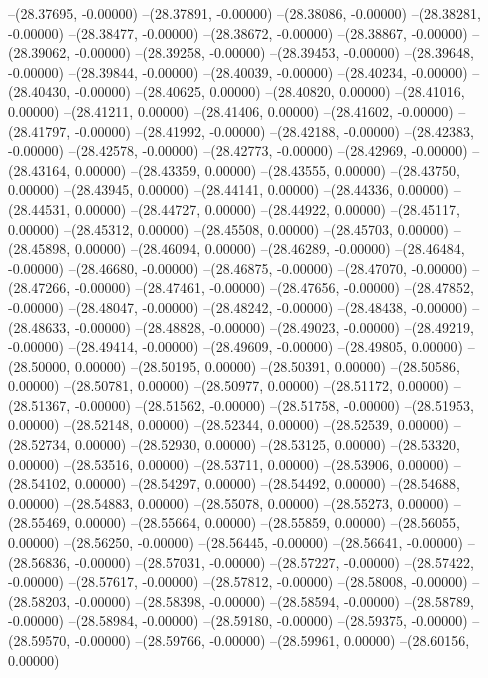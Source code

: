 --(28.37695, -0.00000)
--(28.37891, -0.00000)
--(28.38086, -0.00000)
--(28.38281, -0.00000)
--(28.38477, -0.00000)
--(28.38672, -0.00000)
--(28.38867, -0.00000)
--(28.39062, -0.00000)
--(28.39258, -0.00000)
--(28.39453, -0.00000)
--(28.39648, -0.00000)
--(28.39844, -0.00000)
--(28.40039, -0.00000)
--(28.40234, -0.00000)
--(28.40430, -0.00000)
--(28.40625, 0.00000)
--(28.40820, 0.00000)
--(28.41016, 0.00000)
--(28.41211, 0.00000)
--(28.41406, 0.00000)
--(28.41602, -0.00000)
--(28.41797, -0.00000)
--(28.41992, -0.00000)
--(28.42188, -0.00000)
--(28.42383, -0.00000)
--(28.42578, -0.00000)
--(28.42773, -0.00000)
--(28.42969, -0.00000)
--(28.43164, 0.00000)
--(28.43359, 0.00000)
--(28.43555, 0.00000)
--(28.43750, 0.00000)
--(28.43945, 0.00000)
--(28.44141, 0.00000)
--(28.44336, 0.00000)
--(28.44531, 0.00000)
--(28.44727, 0.00000)
--(28.44922, 0.00000)
--(28.45117, 0.00000)
--(28.45312, 0.00000)
--(28.45508, 0.00000)
--(28.45703, 0.00000)
--(28.45898, 0.00000)
--(28.46094, 0.00000)
--(28.46289, -0.00000)
--(28.46484, -0.00000)
--(28.46680, -0.00000)
--(28.46875, -0.00000)
--(28.47070, -0.00000)
--(28.47266, -0.00000)
--(28.47461, -0.00000)
--(28.47656, -0.00000)
--(28.47852, -0.00000)
--(28.48047, -0.00000)
--(28.48242, -0.00000)
--(28.48438, -0.00000)
--(28.48633, -0.00000)
--(28.48828, -0.00000)
--(28.49023, -0.00000)
--(28.49219, -0.00000)
--(28.49414, -0.00000)
--(28.49609, -0.00000)
--(28.49805, 0.00000)
--(28.50000, 0.00000)
--(28.50195, 0.00000)
--(28.50391, 0.00000)
--(28.50586, 0.00000)
--(28.50781, 0.00000)
--(28.50977, 0.00000)
--(28.51172, 0.00000)
--(28.51367, -0.00000)
--(28.51562, -0.00000)
--(28.51758, -0.00000)
--(28.51953, 0.00000)
--(28.52148, 0.00000)
--(28.52344, 0.00000)
--(28.52539, 0.00000)
--(28.52734, 0.00000)
--(28.52930, 0.00000)
--(28.53125, 0.00000)
--(28.53320, 0.00000)
--(28.53516, 0.00000)
--(28.53711, 0.00000)
--(28.53906, 0.00000)
--(28.54102, 0.00000)
--(28.54297, 0.00000)
--(28.54492, 0.00000)
--(28.54688, 0.00000)
--(28.54883, 0.00000)
--(28.55078, 0.00000)
--(28.55273, 0.00000)
--(28.55469, 0.00000)
--(28.55664, 0.00000)
--(28.55859, 0.00000)
--(28.56055, 0.00000)
--(28.56250, -0.00000)
--(28.56445, -0.00000)
--(28.56641, -0.00000)
--(28.56836, -0.00000)
--(28.57031, -0.00000)
--(28.57227, -0.00000)
--(28.57422, -0.00000)
--(28.57617, -0.00000)
--(28.57812, -0.00000)
--(28.58008, -0.00000)
--(28.58203, -0.00000)
--(28.58398, -0.00000)
--(28.58594, -0.00000)
--(28.58789, -0.00000)
--(28.58984, -0.00000)
--(28.59180, -0.00000)
--(28.59375, -0.00000)
--(28.59570, -0.00000)
--(28.59766, -0.00000)
--(28.59961, 0.00000)
--(28.60156, 0.00000)
